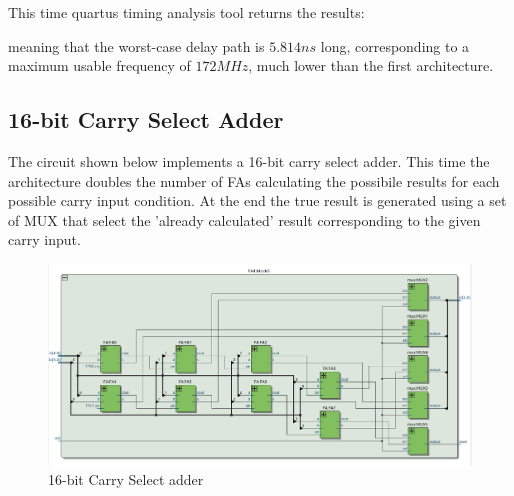 \documentclass[12pt]{article}
\begin{document}
This time quartus timing analysis tool returns the results:
\begin{figure}[!h]
	\centering
	\begin{subfigure}{\linewidth}	
		\centering
	\end{subfigure}
	
\end{figure}

meaning that the worst-case delay path is $5.814 ns $ long, corresponding to a maximum usable frequency of $172MHz$, much lower than the first architecture.

\newpage
\subsection{16-bit Carry Select Adder}

The circuit shown below implements a 16-bit carry select adder. This time the architecture doubles the number of FAs calculating the possibile results for each possible carry input condition. 
At the end the true result is generated using a set of MUX that select the 'already calculated' result corresponding to the given carry input. 
\begin{figure}[!h]
	\centering
	\includegraphics[scale = 0.4]{immagini/niki/rtl3.png}
	\caption{16-bit Carry Select adder }       
\end{figure}
\end{document}
